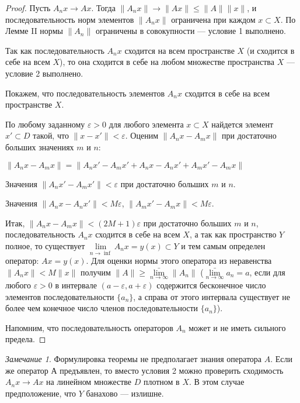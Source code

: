 \documentclass[12pt,a4paper,titlepage, oneside]{book}
\theoremstyle{definition}
\theoremstyle{plain}
\theoremstyle{remark}
\newtheorem*{remark}{Замечание}
\theoremstyle{remark}
\theoremstyle{remark}
\theoremstyle{plain}
\theoremstyle{plain}
\begin{document}
\begin{proof}
 Пусть $A_n x \to A x$. Тогда $\lVert A_n x\rVert \to \lVert A x\rVert \le \lVert A\rVert \lVert x\rVert$, и последовательность норм элементов $\lVert A_n x\rVert$ ограничена при каждом $x \subset X$. По Лемме II нормы $\lVert A_n\rVert$ ограничены в совокупности --- условие 1 выполнено.

Так как последовательность $A_n x$ сходится на всем пространстве $X$ (и сходится в себе на всем $X$), то она сходится в себе на любом множестве пространства $X$ --- условие 2 выполнено.

 Покажем, что последовательность элементов $A_n x$ сходится в себе на всем пространстве $X$.

По любому заданному $\varepsilon > 0$ для любого элемента $x \subset X$ найдется элемент $x' \subset D$ такой, что $\lVert x - x'\rVert < \varepsilon$. Оценим $\lVert A_n x - A_m x\rVert$ при достаточно больших значениях $m$ и $n$:

\begin{center}
$\lVert A_n x - A_m x\rVert = \lVert A_n x' - A_m x' + A_n x - A_n x' + A_m x' - A_m x\rVert$
\end{center}

Значения $\lVert A_n x' - A_m x'\rVert < \varepsilon$ при достаточно больших $m$ и $n$.

Значения $\lVert A_n x - A_n x'\rVert < M\varepsilon$, $\lVert A_m x' - A_m x\rVert < M\varepsilon$.

Итак, $\lVert A_n x - A_m x\rVert < (2M +1)\varepsilon$ при достаточно больших $m$ и $n$, последовательность $A_n x$ сходится в себе на всем $X$, а так как пространство $Y$ полное, то существует $\lim\limits_{n \to \inf} A_n x = y(x) \subset Y$ и тем самым определен оператор: $A x = y(x)$. Для оценки нормы этого оператора из неравенства $\lVert A_n x\rVert < M\lVert x\rVert$ получим $\lVert A\rVert \ge \bar{\lim\limits_{n \to \infty}}\lVert A_n\rVert$ ($\bar{\lim\limits_{n \to \infty}}a_n = a$, если для любого $\varepsilon > 0$ в интервале $(a-\varepsilon, a+\varepsilon)$ содержится бесконечное число элементов последовательности $\lbrace a_n\rbrace$, а справа от этого интервала существует не более чем конечное число членов последовательности $\lbrace a_n\rbrace$).

Напомним, что последовательность операторов $A_n$ может и не иметь сильного предела.
\end{proof}

\begin{remark}
Формулировка теоремы не предполагает знания оператора $A$. Если же оператор $А$ предъявлен, то вместо условия 2 можно проверить сходимость $A_n x\to A x$ на линейном множестве $D$ плотном в $X$. В этом случае предположение, что $Y$ банахово --- излишне.
\end{remark}
\end{document}
